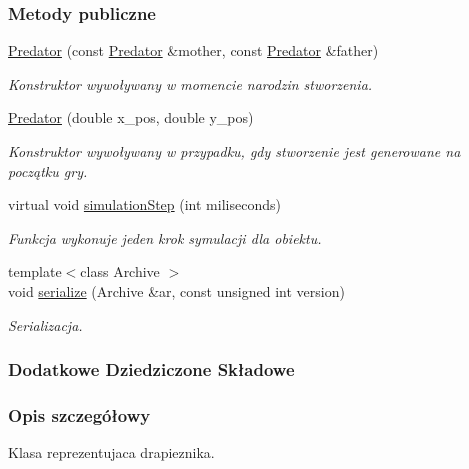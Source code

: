 \subsubsection*{Metody publiczne}
\begin{DoxyCompactItemize}
\item 
\hyperlink{classPredator_adebc1d4ae0858caf8ea906c167a32650}{Predator} (const \hyperlink{classPredator}{Predator} \&mother, const \hyperlink{classPredator}{Predator} \&father)
\begin{DoxyCompactList}\small\item\em Konstruktor wywoływany w momencie narodzin stworzenia. \end{DoxyCompactList}\item 
\hyperlink{classPredator_a889eb8b81088a0e9a0177c3f256e2413}{Predator} (double x\-\_\-pos, double y\-\_\-pos)
\begin{DoxyCompactList}\small\item\em Konstruktor wywoływany w przypadku, gdy stworzenie jest generowane na początku gry. \end{DoxyCompactList}\item 
virtual void \hyperlink{classPredator_a7d8004ead868419138c8782fb392a1b1}{simulation\-Step} (int miliseconds)
\begin{DoxyCompactList}\small\item\em Funkcja wykonuje jeden krok symulacji dla obiektu. \end{DoxyCompactList}\item 
{\footnotesize template$<$class Archive $>$ }\\void \hyperlink{classPredator_abf2e6236a7a0a26d97fbd6ebbfa09733}{serialize} (Archive \&ar, const unsigned int version)
\begin{DoxyCompactList}\small\item\em Serializacja. \end{DoxyCompactList}\end{DoxyCompactItemize}
\subsubsection*{Dodatkowe Dziedziczone Składowe}


\subsubsection{Opis szczegółowy}
Klasa reprezentujaca drapieznika. 

